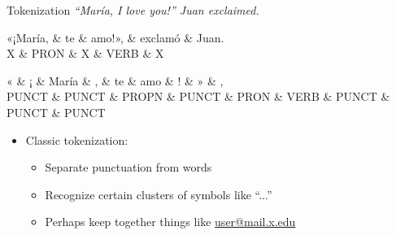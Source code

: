\documentclass[10pt, compress, aspectratio=169]{beamer}
\begin{document}
\begin{frame}{Tokenization}
\textit{“María, I love you!” Juan exclaimed.}

\begin{dependency}[label style={thick, font=\bfseries}]
\begin{deptext}[column sep=3pt, font=\bfseries]
«¡María, \& te \& amo!», \& exclamó \& Juan. \\[0.1cm]
X \& PRON \& X \& VERB \& X \\
\end{deptext}
\end{dependency}
\begin{dependency}[label style={thick, font=\bfseries}]
\begin{deptext}[font=\bfseries]
« \& ¡ \& María \& , \& te \& amo \& ! \& » \& , \\[0.1cm]%
PUNCT \& PUNCT \& PROPN \& PUNCT \& PRON \& VERB \& PUNCT \& PUNCT \& PUNCT \\%
\end{deptext}
\end{dependency}
\begin{itemize}
\item Classic tokenization:
\begin{itemize}
\item Separate punctuation from words
\item Recognize certain clusters of symbols like ``...''
\item Perhaps keep together things like \url{user@mail.x.edu}
\end{itemize}
\end{itemize}
\end{frame}
\end{document}
